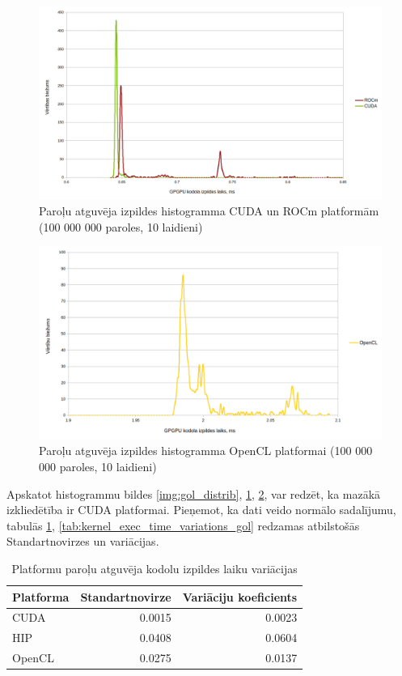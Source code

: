 \begin{figure}[H] \centering
    \includegraphics[width=\textwidth]{images/sha_distrib_cuda_rocm.png}
    \caption{Paroļu atguvēja izpildes histogramma CUDA un ROCm platformām (100
    000 000 paroles, 10 laidieni)} \label{img:sha_distrib}
\end{figure}


\begin{figure}[H] \centering
    \includegraphics[width=\textwidth]{images/sha_distrib_opencl.png}
    \caption{Paroļu atguvēja izpildes histogramma OpenCL platformai (100 000
    000 paroles, 10 laidieni)} \label{img:sha_distrib_cl}
\end{figure}

Apskatot histogrammu bildes \ref{img:gol_distrib}, \ref{img:sha_distrib},
\ref{img:sha_distrib_cl}, var redzēt, ka mazākā izkliedētība ir CUDA
platformai. Pieņemot, ka dati veido normālo sadalījumu, tabulās \ref{tab:kern},
\ref{tab:kernel_exec_time_variations_gol} redzamas atbilstošās Standartnovirzes
un variācijas.


\begin{table}[H]
    \centering
    \begin{tabular}{lrr}
    \hline
    \textbf{Platforma} & \textbf{Standartnovirze} & \textbf{Variāciju koeficients}\\ \hline
    CUDA    & 0.0015 & 0.0023 \\
    HIP     & 0.0408 & 0.0604  \\
    OpenCL  & 0.0275 & 0.0137 \\
    \hline
    \end{tabular}
    \caption{Platformu paroļu atguvēja kodolu izpildes laiku variācijas}
    \label{tab:kern} 
\end{table}


